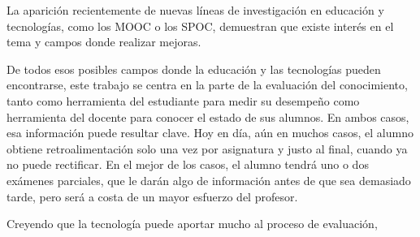 La aparición recientemente de nuevas líneas de investigación en educación y tecnologías, como los \acrshort{MOOC} o los \acrshort{SPOC}, demuestran que existe interés en el tema y campos donde realizar mejoras.

De todos esos posibles campos donde la educación y las tecnologías pueden encontrarse, este trabajo se centra en la parte de la evaluación del conocimiento, tanto como herramienta del estudiante para medir su desempeño como herramienta del docente para conocer el estado de sus alumnos. En ambos casos, esa información puede resultar clave. Hoy en día, aún en muchos casos, el alumno obtiene retroalimentación solo una vez por asignatura y justo al final, cuando ya no puede rectificar. En el mejor de los casos, el alumno tendrá uno o dos exámenes parciales, que le darán algo de información antes de que sea demasiado tarde, pero será a costa de un mayor esfuerzo del profesor.

Creyendo que la tecnología puede aportar mucho al proceso de evaluación, 










